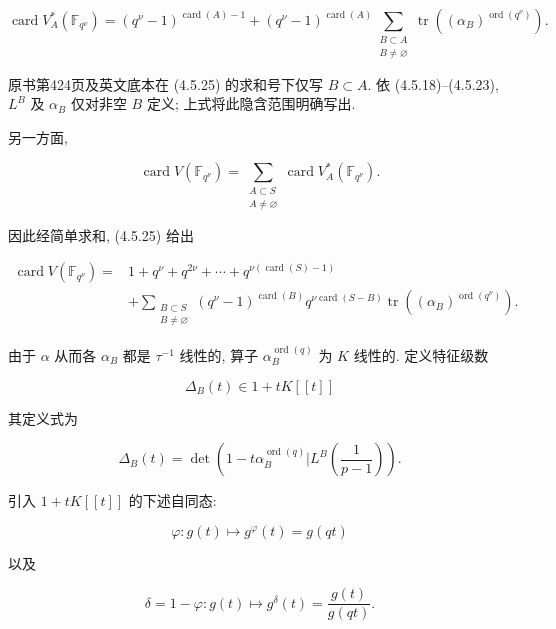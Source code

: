 \begin{equation}\tag{4.5.25}
\operatorname{card}V_A^*(\mathbb F_{q^\nu})
=(q^\nu-1)^{\operatorname{card}(A)-1}
+(q^\nu-1)^{\operatorname{card}(A)}
\sum_{\substack{B\subset A\\B\ne\varnothing}}
\operatorname{tr}\!\left((\alpha_B)^{\operatorname{ord}(q^\nu)}\right).
\end{equation}

\begin{editorialnote}
原书第424页及英文底本在 (4.5.25) 的求和号下仅写 $B\subset A$.
依 (4.5.18)--(4.5.23), $L^B$ 及 $\alpha_B$ 仅对非空 $B$ 定义; 上式将此隐含范围明确写出.
\end{editorialnote}

另一方面,

\begin{equation}\tag{4.5.26}
\operatorname{card}V(\mathbb F_{q^\nu})
=\sum_{\substack{A\subset S\\A\ne\varnothing}}
\operatorname{card}V_A^*(\mathbb F_{q^\nu}).
\end{equation}

因此经简单求和, (4.5.25) 给出

\begin{equation}\tag{4.5.27}
\begin{aligned}
\operatorname{card}V(\mathbb F_{q^\nu})
={}&1+q^\nu+q^{2\nu}+\cdots
+q^{\nu(\operatorname{card}(S)-1)}\\
&+\sum_{\substack{B\subset S\\B\ne\varnothing}}
(q^\nu-1)^{\operatorname{card}(B)}
q^{\nu\operatorname{card}(S-B)}
\operatorname{tr}\!\left((\alpha_B)^{\operatorname{ord}(q^\nu)}\right).
\end{aligned}
\end{equation}

由于 $\alpha$ 从而各 $\alpha_B$ 都是 $\tau^{-1}$ 线性的,
算子 $\alpha_B^{\operatorname{ord}(q)}$ 为 $K$ 线性的. 定义特征级数

\[
\Delta_B(t)\in1+tK[[t]]
\]

其定义式为

\begin{equation}\tag{4.5.28}
\Delta_B(t)=\det\!\left(
1-t\alpha_B^{\operatorname{ord}(q)}
\mathrel{\Big|}L^B\!\left(\frac1{p-1}\right)\right).
\end{equation}

引入 $1+tK[[t]]$ 的下述自同态:

\begin{equation}\tag{4.5.29}
\varphi:g(t)\longmapsto g^\varphi(t)=g(qt)
\end{equation}

以及

\begin{equation}\tag{4.5.30}
\delta=1-\varphi:g(t)\longmapsto
g^\delta(t)=\frac{g(t)}{g(qt)}.
\end{equation}
